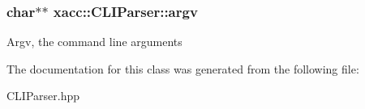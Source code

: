\subsubsection[{\texorpdfstring{argv}{argv}}]{\setlength{\rightskip}{0pt plus 5cm}char$\ast$$\ast$ xacc\+::\+C\+L\+I\+Parser\+::argv\hspace{0.3cm}{\ttfamily [protected]}}\hypertarget{a00018_aa269b5c9a78f2fe3e4ac48012eb3cc06}{}\label{a00018_aa269b5c9a78f2fe3e4ac48012eb3cc06}
Argv, the command line arguments 

The documentation for this class was generated from the following file\+:\begin{DoxyCompactItemize}
\item 
C\+L\+I\+Parser.\+hpp\end{DoxyCompactItemize}
